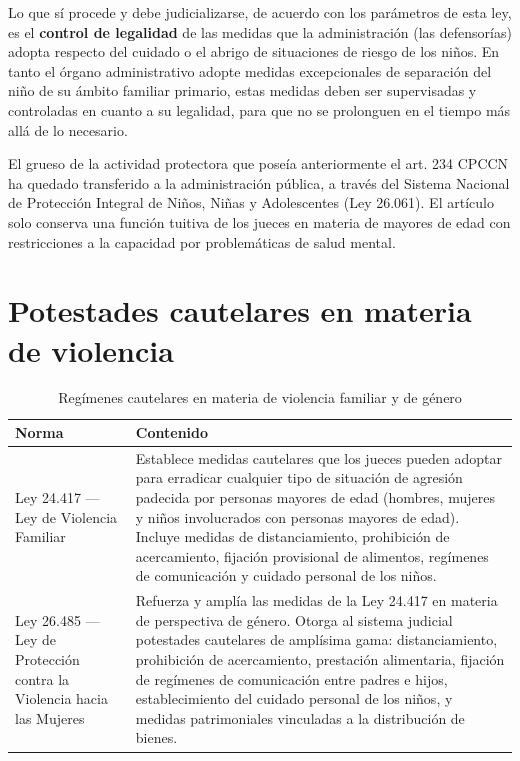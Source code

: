\documentclass[12pt,oneside]{book}
\begin{document}
Lo que sí procede y debe judicializarse, de acuerdo con los parámetros de esta ley, es el \textbf{control de legalidad} de las medidas que la administración (las defensorías) adopta respecto del cuidado o el abrigo de situaciones de riesgo de los niños. En tanto el órgano administrativo adopte medidas excepcionales de separación del niño de su ámbito familiar primario, estas medidas deben ser supervisadas y controladas en cuanto a su legalidad, para que no se prolonguen en el tiempo más allá de lo necesario.

\begin{note}
El grueso de la actividad protectora que poseía anteriormente el art. 234 CPCCN ha quedado transferido a la administración pública, a través del Sistema Nacional de Protección Integral de Niños, Niñas y Adolescentes (Ley 26.061). El artículo solo conserva una función tuitiva de los jueces en materia de mayores de edad con restricciones a la capacidad por problemáticas de salud mental.
\end{note}

\section{Potestades cautelares en materia de violencia}

\begin{table}[H]
\centering
\caption{Regímenes cautelares en materia de violencia familiar y de género}
\begin{tabularx}{\textwidth}{l X}
\toprule
\textbf{Norma} & \textbf{Contenido} \\
\midrule
Ley 24.417 --- Ley de Violencia Familiar & Establece medidas cautelares que los jueces pueden adoptar para erradicar cualquier tipo de situación de agresión padecida por personas mayores de edad (hombres, mujeres y niños involucrados con personas mayores de edad). Incluye medidas de distanciamiento, prohibición de acercamiento, fijación provisional de alimentos, regímenes de comunicación y cuidado personal de los niños. \\
\addlinespace
Ley 26.485 --- Ley de Protección contra la Violencia hacia las Mujeres & Refuerza y amplía las medidas de la Ley 24.417 en materia de perspectiva de género. Otorga al sistema judicial potestades cautelares de amplísima gama: distanciamiento, prohibición de acercamiento, prestación alimentaria, fijación de regímenes de comunicación entre padres e hijos, establecimiento del cuidado personal de los niños, y medidas patrimoniales vinculadas a la distribución de bienes. \\
\bottomrule
\end{tabularx}
\end{table}
\end{document}
